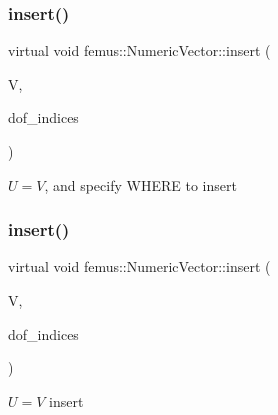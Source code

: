 \subsubsection{\texorpdfstring{insert()}{insert()}\hspace{0.1cm}{\footnotesize\ttfamily [2/4]}}
{\footnotesize\ttfamily virtual void femus\+::\+Numeric\+Vector\+::insert (\begin{DoxyParamCaption}\item[{const \mbox{\hyperlink{classfemus_1_1_numeric_vector}{Numeric\+Vector}} \&}]{V,  }\item[{const std\+::vector$<$ int $>$ \&}]{dof\+\_\+indices }\end{DoxyParamCaption})\hspace{0.3cm}{\ttfamily [pure virtual]}}



$U=V$, and specify W\+H\+E\+RE to insert 

\mbox{\label{classfemus_1_1_numeric_vector_aa141a3133a2a35962713cb331d8137f3}} 
\subsubsection{\texorpdfstring{insert()}{insert()}\hspace{0.1cm}{\footnotesize\ttfamily [3/4]}}
{\footnotesize\ttfamily virtual void femus\+::\+Numeric\+Vector\+::insert (\begin{DoxyParamCaption}\item[{const \mbox{\hyperlink{classfemus_1_1_dense_vector}{Dense\+Vector}} \&}]{V,  }\item[{const std\+::vector$<$ int $>$ \&}]{dof\+\_\+indices }\end{DoxyParamCaption})\hspace{0.3cm}{\ttfamily [pure virtual]}}



$ U=V $ insert 

\mbox{\label{classfemus_1_1_numeric_vector_aa8ba2833d62343508676066556bbe506}} 
